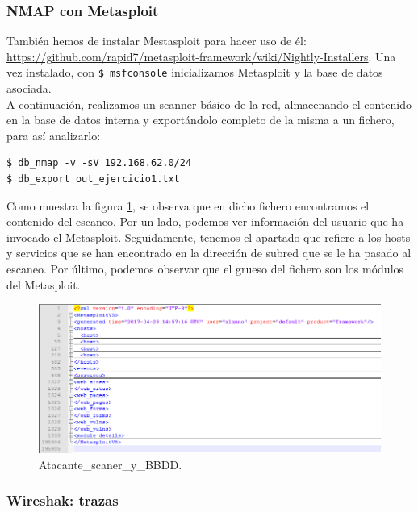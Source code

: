 \documentclass[a4,12pt,onecolum]{article}
\begin{document}
\subsubsection{NMAP con Metasploit}

También hemos de instalar Mestasploit para hacer uso de él: \url{https://github.com/rapid7/metasploit-framework/wiki/Nightly-Installers}. Una vez instalado, con \texttt{\$ msfconsole} inicializamos Metasploit y la base de datos asociada. \\

A continuación, realizamos un scanner básico de la red, almacenando el contenido en la base de datos interna y exportándolo completo de la misma a un fichero, para así analizarlo:

\begin{verbatim}
$ db_nmap -v -sV 192.168.62.0/24
$ db_export out_ejercicio1.txt
\end{verbatim}

Como muestra la figura \ref{fig:nmap4}, se observa que en dicho fichero encontramos el contenido del escaneo. Por un lado, podemos ver información del usuario que ha invocado el Metasploit. Seguidamente, tenemos el apartado que refiere a los hosts y servicios que se han encontrado en la dirección de subred que se le ha pasado al escaneo. Por último, podemos observar que el grueso del fichero son los módulos del Metasploit.

\begin{figure}[htbp]
\centering
\includegraphics[width=1.0\textwidth]{./images/Atacante_scaner_y_BBDD.png}
\caption{Atacante\_scaner\_y\_BBDD.}
\label{fig:nmap4}
\end{figure}


\subsubsection{Wireshak: trazas}
\end{document}
